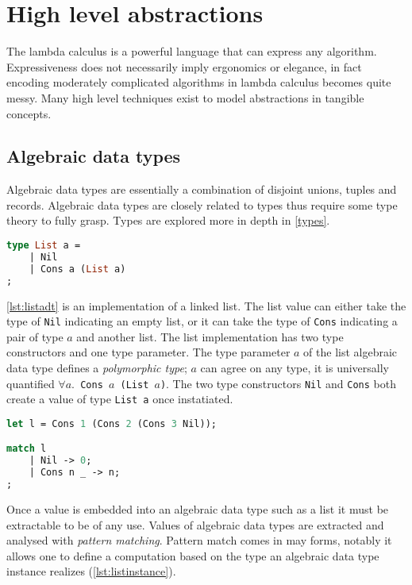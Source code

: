 \documentclass[11pt,oneside,a4paper]{report}
\begin{document}
\section{High level abstractions}\label{sec:highlevel}
The lambda calculus is a powerful language that can express any algorithm.
Expressiveness does not necessarily imply ergonomics or elegance, in fact encoding moderately complicated algorithms in lambda calculus becomes quite messy.
Many high level techniques exist to model abstractions in tangible concepts.

\subsection{Algebraic data types}
Algebraic data types are essentially a combination of disjoint unions, tuples and records.
Algebraic data types are closely related to types thus require some type theory to fully grasp.
Types are explored more in depth in \autoref{types}.
\begin{lstlisting}[language=ML,caption={List algebraic data type},label={lst:listadt}]
type List a = 
    | Nil
    | Cons a (List a)
;
\end{lstlisting}
\autoref{lst:listadt} is an implementation of a linked list. 
The list value can either take the type of \texttt{Nil} indicating an empty list, or it can take the type of \texttt{Cons} indicating a pair of type $a$ and another list.
The list implementation has two type constructors and one type parameter.
The type parameter $a$ of the list algebraic data type defines a \textit{polymorphic type}; $a$ can agree on any type, it is universally quantified \texttt{$\forall a. $ Cons $a$ (List $a$)}.
The two type constructors \texttt{Nil} and \texttt{Cons} both create a value of type \texttt{List a} once instatiated.
\begin{lstlisting}[language=ML,caption={List instance and match},label={lst:listinstance}]
let l = Cons 1 (Cons 2 (Cons 3 Nil));

match l 
    | Nil -> 0;
    | Cons n _ -> n;
;
\end{lstlisting}
Once a value is embedded into an algebraic data type such as a list it must be extractable to be of any use.
Values of algebraic data types are extracted and analysed with \textit{pattern matching}.
Pattern match comes in may forms, notably it allows one to define a computation based on the type an algebraic data type instance realizes (\autoref{lst:listinstance}).
\end{document}
